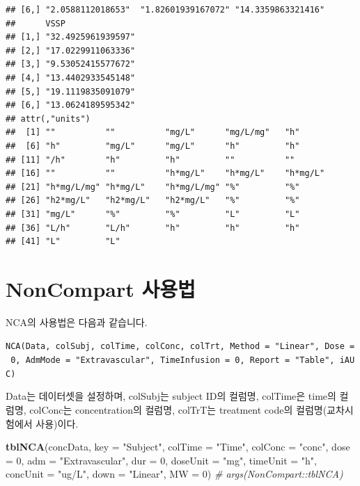 \documentclass[12pt,]{krantz}
\newenvironment{Shaded}{\begin{snugshade}}{\end{snugshade}}
\newcommand{\KeywordTok}[1]{\textcolor[rgb]{0.13,0.29,0.53}{\textbf{#1}}}
\newcommand{\DataTypeTok}[1]{\textcolor[rgb]{0.13,0.29,0.53}{#1}}
\newcommand{\DecValTok}[1]{\textcolor[rgb]{0.00,0.00,0.81}{#1}}
\newcommand{\StringTok}[1]{\textcolor[rgb]{0.31,0.60,0.02}{#1}}
\newcommand{\CommentTok}[1]{\textcolor[rgb]{0.56,0.35,0.01}{\textit{#1}}}
\newcommand{\NormalTok}[1]{#1}
\theoremstyle{definition}
\theoremstyle{definition}
\theoremstyle{definition}
\theoremstyle{remark}
\begin{document}
\begin{verbatim}
## [6,] "2.0588112018653"  "1.82601939167072" "14.3359863321416"
##      VSSP              
## [1,] "32.4925961939597"
## [2,] "17.0229911063336"
## [3,] "9.53052415577672"
## [4,] "13.4402933545148"
## [5,] "19.1119835091079"
## [6,] "13.0624189595342"
## attr(,"units")
##  [1] ""          ""          "mg/L"      "mg/L/mg"   "h"        
##  [6] "h"         "mg/L"      "mg/L"      "h"         "h"        
## [11] "/h"        "h"         "h"         ""          ""         
## [16] ""          ""          "h*mg/L"    "h*mg/L"    "h*mg/L"   
## [21] "h*mg/L/mg" "h*mg/L"    "h*mg/L/mg" "%"         "%"        
## [26] "h2*mg/L"   "h2*mg/L"   "h2*mg/L"   "%"         "%"        
## [31] "mg/L"      "%"         "%"         "L"         "L"        
## [36] "L/h"       "L/h"       "h"         "h"         "h"        
## [41] "L"         "L"
\end{verbatim}

\section{NonCompart 사용법}\label{how-to-use}

NCA의 사용법은 다음과 같습니다.

\texttt{NCA(Data,\ colSubj,\ colTime,\ colConc,\ colTrt,\ Method\ =\ "Linear",\ Dose\ =\ 0,\ AdmMode\ =\ "Extravascular",\ TimeInfusion\ =\ 0,\ Report\ =\ "Table",\ iAUC)}

Data는 데이터셋을 설정하며, colSubj는 subject ID의 컬럼명, colTime은
time의 컬럼명, colConc는 concentration의 컬럼명, colTrT는 treatment
code의 컬럼명(교차시험에서 사용)이다.

\begin{Shaded}
\begin{Highlighting}[]
\KeywordTok{tblNCA}\NormalTok{(concData, }\DataTypeTok{key =} \StringTok{"Subject"}\NormalTok{, }\DataTypeTok{colTime =} \StringTok{"Time"}\NormalTok{, }\DataTypeTok{colConc =} \StringTok{"conc"}\NormalTok{, }
       \DataTypeTok{dose =} \DecValTok{0}\NormalTok{, }\DataTypeTok{adm =} \StringTok{"Extravascular"}\NormalTok{, }\DataTypeTok{dur =} \DecValTok{0}\NormalTok{, }\DataTypeTok{doseUnit =} \StringTok{"mg"}\NormalTok{, }
       \DataTypeTok{timeUnit =} \StringTok{"h"}\NormalTok{, }\DataTypeTok{concUnit =} \StringTok{"ug/L"}\NormalTok{, }\DataTypeTok{down =} \StringTok{"Linear"}\NormalTok{, }\DataTypeTok{MW =} \DecValTok{0}\NormalTok{)}
\CommentTok{# args(NonCompart::tblNCA)}
\end{Highlighting}
\end{Shaded}
\end{document}
